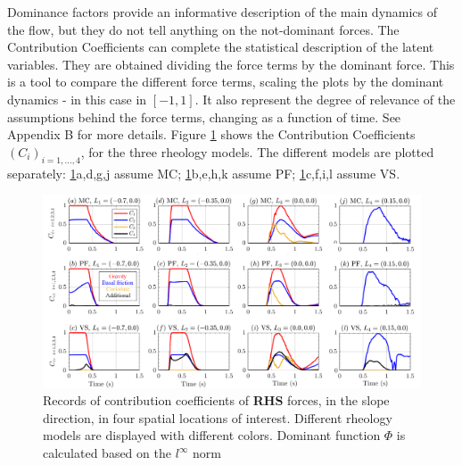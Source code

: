 \documentclass{article}
\begin{document}
Dominance factors provide an informative description of the main dynamics of the flow, but they do not tell anything on the not-dominant forces. The Contribution Coefficients can complete the statistical description of the latent variables. They are obtained dividing the force terms by the dominant force. This is a tool to compare the different force terms, scaling the plots by the dominant dynamics - in this case in $[-1,1]$. It also represent the degree of relevance of the assumptions behind the force terms, changing as a function of time. See Appendix B for more details. Figure \ref{fig:Ramp-Ci_x} shows the Contribution Coefficients $(C_i)_{i=1,\dots,4}$, for the three rheology models. The different models are plotted separately: \ref{fig:Ramp-Ci_x}a,d,g,j assume MC; \ref{fig:Ramp-Ci_x}b,e,h,k assume PF; \ref{fig:Ramp-Ci_x}c,f,i,l assume VS.
\begin{figure}[H]
         \centering
        \includegraphics[width=1\textwidth]{InclinedPlane/ForceContrib/Ci_x.png}
        \caption{Records of contribution coefficients of \textbf{RHS} forces, in the slope direction, in four spatial locations of interest. Different rheology models are displayed with different colors. Dominant function $\Phi$ is calculated based on the $l^\infty$ norm}
        \label{fig:Ramp-Ci_x}
\end{figure}
\end{document}
